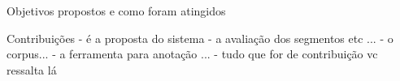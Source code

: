 
Objetivos propostos e como foram atingidos





Contribuições	
	- é a proposta do sistema 
	- a avaliação dos segmentos etc ... 
	- o corpus... 
	- a ferramenta para anotação ... 
	- tudo que for de contribuição vc ressalta lá 








































